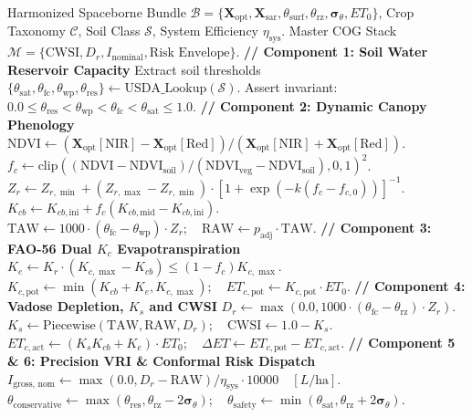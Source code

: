 \documentclass[11pt,a4paper]{article}
\theoremstyle{definition}
\theoremstyle{remark}
\begin{document}
\begin{algorithm}[H]
\caption{End-to-End Spaceborne Agriculture Domain Translation Pipeline}
\label{alg:agri_pipeline}
\begin{algorithmic}[1]
\Require Harmonized Spaceborne Bundle $\mathcal{B} = \{\mathbf{X}_{\text{opt}}, \mathbf{X}_{\text{sar}}, \theta_{\text{surf}}, \theta_{\text{rz}}, \boldsymbol{\sigma}_{\theta}, ET_0\}$, Crop Taxonomy $\mathcal{C}$, Soil Class $\mathcal{S}$, System Efficiency $\eta_{\text{sys}}$.
\Ensure Master COG Stack $\mathcal{M} = \{\text{CWSI}, D_r, I_{\text{nominal}}, \text{Risk Envelope}\}$.
\State \textbf{// Component 1: Soil Water Reservoir Capacity}
\State Extract soil thresholds $\{\theta_{\text{sat}}, \theta_{\text{fc}}, \theta_{\text{wp}}, \theta_{\text{res}}\} \leftarrow \text{USDA\_Lookup}(\mathcal{S})$.
\State Assert invariant: $0.0 \le \theta_{\text{res}} < \theta_{\text{wp}} < \theta_{\text{fc}} < \theta_{\text{sat}} \le 1.0$.
\State \textbf{// Component 2: Dynamic Canopy Phenology}
\State $\text{NDVI} \leftarrow (\mathbf{X}_{\text{opt}}[\text{NIR}] - \mathbf{X}_{\text{opt}}[\text{Red}]) / (\mathbf{X}_{\text{opt}}[\text{NIR}] + \mathbf{X}_{\text{opt}}[\text{Red}])$.
\State $f_c \leftarrow \text{clip}((\text{NDVI} - \text{NDVI}_{\text{soil}})/(\text{NDVI}_{\text{veg}} - \text{NDVI}_{\text{soil}}), 0, 1)^2$.
\State $Z_r \leftarrow Z_{r,\min} + (Z_{r,\max} - Z_{r,\min}) \cdot [1 + \exp(-k(f_c - f_{c,0}))]^{-1}$.
\State $K_{cb} \leftarrow K_{cb,\text{ini}} + f_c (K_{cb,\text{mid}} - K_{cb,\text{ini}})$.
\State $\text{TAW} \leftarrow 1000 \cdot (\theta_{\text{fc}} - \theta_{\text{wp}}) \cdot Z_r; \quad \text{RAW} \leftarrow p_{\text{adj}} \cdot \text{TAW}$.
\State \textbf{// Component 3: FAO-56 Dual $K_c$ Evapotranspiration}
\State $K_e \leftarrow K_r \cdot (K_{c,\max} - K_{cb}) \le (1 - f_c) K_{c,\max}$.
\State $K_{c,\text{pot}} \leftarrow \min(K_{cb} + K_e, K_{c,\max}); \quad ET_{c,\text{pot}} \leftarrow K_{c,\text{pot}} \cdot ET_0$.
\State \textbf{// Component 4: Vadose Depletion, $K_s$ and CWSI}
\State $D_r \leftarrow \max(0.0, 1000 \cdot (\theta_{\text{fc}} - \theta_{\text{rz}}) \cdot Z_r)$.
\State $K_s \leftarrow \text{Piecewise}(\text{TAW}, \text{RAW}, D_r); \quad \text{CWSI} \leftarrow 1.0 - K_s$.
\State $ET_{c,\text{act}} \leftarrow (K_s K_{cb} + K_e) \cdot ET_0; \quad \Delta ET \leftarrow ET_{c,\text{pot}} - ET_{c,\text{act}}$.
\State \textbf{// Component 5 \& 6: Precision VRI \& Conformal Risk Dispatch}
\State $I_{\text{gross, nom}} \leftarrow \max(0.0, D_r - \text{RAW}) / \eta_{\text{sys}} \cdot 10000 \quad [L/\text{ha}]$.
\State $\theta_{\text{conservative}} \leftarrow \max(\theta_{\text{res}}, \theta_{\text{rz}} - 2\boldsymbol{\sigma}_{\theta}); \quad \theta_{\text{safety}} \leftarrow \min(\theta_{\text{sat}}, \theta_{\text{rz}} + 2\boldsymbol{\sigma}_{\theta})$.

\end{algorithmic}
\end{algorithm}
\end{document}
